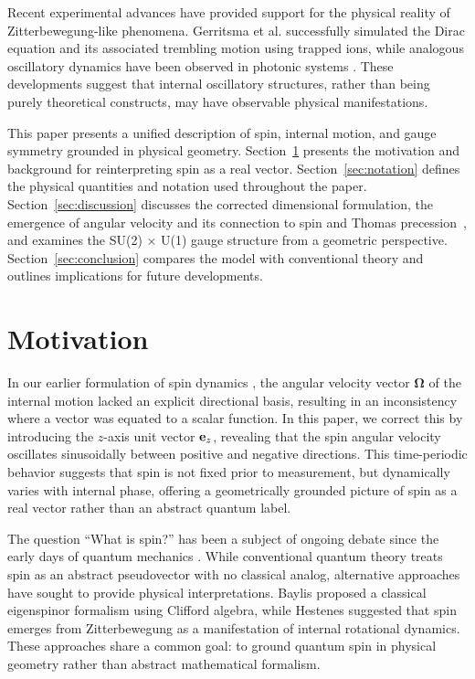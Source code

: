 \documentclass[%
 reprint,
 amsmath,amssymb,
 aps,
]{revtex4-1}
\numberwithin{equation}{section}%
\begin{document}
Recent experimental advances have provided support for the physical reality of Zitterbewegung-like phenomena. Gerritsma et al. \cite{gerritsma2010} successfully simulated the Dirac equation and its associated trembling motion using trapped ions, while analogous oscillatory dynamics have been observed in photonic systems \cite{zhang2023}. These developments suggest that internal oscillatory structures, rather than being purely theoretical constructs, may have observable physical manifestations.

This paper presents a unified description of spin, internal motion, and gauge symmetry grounded in physical geometry. Section~\ref{sec:motivation} presents the motivation and background for reinterpreting spin as a real vector. Section~\ref{sec:notation} defines the physical quantities and notation used throughout the paper. Section~\ref{sec:discussion} discusses the corrected dimensional formulation, the emergence of angular velocity and its connection to spin and Thomas precession~\cite{thomas1926}, and examines the SU(2) × U(1) gauge structure from a geometric perspective. Section~\ref{sec:conclusion} compares the model with conventional theory and outlines implications for future developments.


\section{Motivation}
\label{sec:motivation}

In our earlier formulation of spin dynamics \cite{hanamura2309.0047}, the angular velocity vector $\boldsymbol{\Omega}$ of the internal motion lacked an explicit directional basis, resulting in an inconsistency where a vector was equated to a scalar function. In this paper, we correct this by introducing the $z$-axis unit vector ${\bf e}_z$, revealing that the spin angular velocity oscillates sinusoidally between positive and negative directions. This time-periodic behavior suggests that spin is not fixed prior to measurement, but dynamically varies with internal phase, offering a geometrically grounded picture of spin as a real vector rather than an abstract quantum label.

The question ``What is spin?'' has been a subject of ongoing debate since the early days of quantum mechanics \cite{ohanian1986}. While conventional quantum theory treats spin as an abstract pseudovector with no classical analog, alternative approaches have sought to provide physical interpretations. Baylis \cite{baylis1992} proposed a classical eigenspinor formalism using Clifford algebra, while Hestenes \cite{hestenes1990} suggested that spin emerges from Zitterbewegung as a manifestation of internal rotational dynamics. These approaches share a common goal: to ground quantum spin in physical geometry rather than abstract mathematical formalism.
\end{document}
